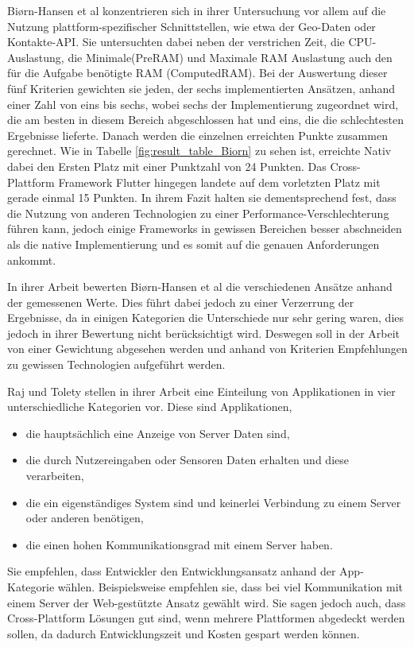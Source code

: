 Biørn-Hansen et al \cite{BirnHansen.2020} konzentrieren sich in ihrer Untersuchung vor allem auf die Nutzung plattform-spezifischer Schnittstellen, wie etwa der Geo-Daten oder Kontakte-API. Sie untersuchten dabei neben der verstrichen Zeit, die CPU-Auslastung, die Minimale(PreRAM) und Maximale RAM Auslastung auch den für die Aufgabe benötigte RAM (ComputedRAM). Bei der Auswertung dieser fünf Kriterien gewichten sie jeden, der sechs implementierten Ansätzen, anhand einer Zahl von eins bis sechs, wobei sechs der Implementierung zugeordnet wird, die am besten in diesem Bereich abgeschlossen hat und eins, die die schlechtesten Ergebnisse lieferte. Danach werden die einzelnen erreichten Punkte zusammen gerechnet. Wie in Tabelle \ref{fig:result_table_Biorn} zu sehen ist, erreichte Nativ dabei den Ersten Platz mit einer Punktzahl von 24 Punkten. Das Cross-Plattform Framework Flutter hingegen landete auf dem vorletzten Platz mit gerade einmal 15 Punkten. In ihrem Fazit halten sie dementsprechend fest, dass die Nutzung von anderen Technologien zu einer Performance-Verschlechterung führen kann, jedoch einige Frameworks in gewissen Bereichen besser abschneiden als die native Implementierung und es somit auf die genauen Anforderungen ankommt.

In ihrer Arbeit bewerten Biørn-Hansen et al \cite{BirnHansen.2020} die verschiedenen Ansätze anhand der gemessenen Werte. Dies führt dabei jedoch zu einer Verzerrung der Ergebnisse, da in einigen Kategorien die Unterschiede nur sehr gering waren, dies jedoch in ihrer Bewertung nicht berücksichtigt wird. Deswegen soll in der Arbeit von einer Gewichtung abgesehen werden und anhand von Kriterien Empfehlungen zu gewissen Technologien aufgeführt werden.

Raj und Tolety \cite{IEEE_Rahul_Seshu} stellen in ihrer Arbeit eine Einteilung von Applikationen in vier unterschiedliche Kategorien vor. Diese sind Applikationen,
\begin{itemize}
    \item die hauptsächlich eine Anzeige von Server Daten sind,
    \item die durch Nutzereingaben oder Sensoren Daten erhalten und diese verarbeiten,
    \item die ein eigenständiges System sind und keinerlei Verbindung zu einem Server oder anderen benötigen,
    \item die einen hohen Kommunikationsgrad mit einem Server haben.
\end{itemize}
Sie empfehlen, dass Entwickler den Entwicklungsansatz anhand der App-Kategorie wählen. Beispielsweise empfehlen sie, dass bei viel Kommunikation mit einem Server der Web-gestützte Ansatz gewählt wird. Sie sagen jedoch auch, dass Cross-Plattform Lösungen gut sind, wenn mehrere Plattformen abgedeckt werden sollen, da dadurch Entwicklungszeit und Kosten gespart werden können.

